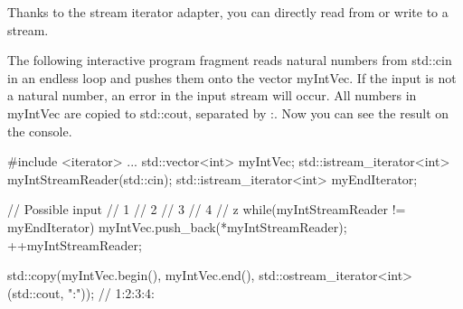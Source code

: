 Thanks to the stream iterator adapter, you can directly read from or write to a stream.

The following interactive program fragment reads natural numbers from std::cin in an endless loop and pushes them onto the vector myIntVec. If the input is not a natural number, an error in the input stream will occur. All numbers in myIntVec are copied to std::cout, separated by :. Now you can see the result on the console.

\begin{cpp}
#include <iterator>
...
std::vector<int> myIntVec;
std::istream_iterator<int> myIntStreamReader(std::cin);
std::istream_iterator<int> myEndIterator;

// Possible input
// 1
// 2
// 3
// 4
// z
while(myIntStreamReader != myEndIterator){
	myIntVec.push_back(*myIntStreamReader);
	++myIntStreamReader;
}

std::copy(myIntVec.begin(), myIntVec.end(),
			std::ostream_iterator<int>(std::cout, ":"));
			// 1:2:3:4:
\end{cpp}




























